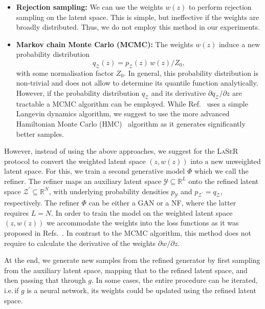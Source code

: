 \begin{itemize}
    \item \textbf{Rejection sampling:}
    We can use the weights $w(z)$ to perform rejection sampling on the latent space. This is simple, but ineffective if the weights are broadly distributed. Thus, we do not employ this method in our experiments.
    \item \textbf{Markov chain Monte Carlo (MCMC):}
    The weights $w(z)$ induce a new probability distribution
    \begin{equation}
        q_\mathcal{Z}(z)= p_\mathcal{Z}(z)\,w(z)/Z_0,
        \label{eq:mcmc_distribution}
    \end{equation}
    with some normalisation factor $Z_0$. In general, this probability distribution is non-trivial and does not allow to determine its quantile function analytically.
However, if the probability distribution $q_\mathcal{Z}$ and its derivative $\partial q_\mathcal{Z}/\partial z$ are tractable a MCMC algorithm can be employed. While Ref.~\cite{che2020gan} uses a simple Langevin dynamics algorithm, we suggest to use the more advanced Hamiltonian Monte Carlo (HMC)~\cite{DUANE1987216,neal2012mcmc} algorithm as it generates significantly better samples.
\end{itemize}

However, instead of using the above approaches, we suggest for the \textsc{LaSeR} protocol to convert the weighted latent space $(z,w(z))$ into a new unweighted latent space.
For this, we train a second generative model $\Phi$ which we call the refiner. The refiner maps an auxiliary latent space $\mathcal{Y}\subseteq\mathbb{R}^L$ onto the refined latent space $\mathcal{Z}^\prime\subseteq\mathbb{R}^N$, with underlying probability densities $p_\mathcal{Y}$ and
$p_{\mathcal{Z}^\prime}=q_\mathcal{Z}$, respectively.
The refiner $\Phi$ can be either a GAN or a NF, where the latter requires $L=N$. In order to train the model on the weighted latent space $(z,w(z))$ we accommodate the weights into the loss functions as it was proposed in Refs.~\cite{Backes:2020vka, Verheyen:2020bjw}. In contrast to the MCMC algorithm, this method does not require to calculate the derivative of the weights $\partial w/\partial z$.

At the end, we generate new samples from the refined generator by first sampling from the auxiliary latent space, mapping that to the refined latent space, and then passing that through $g$. In some cases, the entire procedure can be iterated, i.e.\,if $g$ is a neural network, its weights could be updated using the refined latent space.

